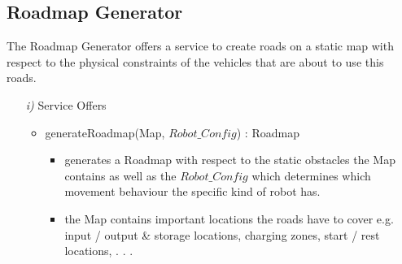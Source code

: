 \documentclass{article}
\begin{document}
\subsection{Roadmap Generator}
The Roadmap Generator offers a service to create roads on a static map with respect to the physical constraints of the vehicles that are about to use this roads.
\begin{enumerate}
	\item[\textit{i)}] Service Offers
	\begin{itemize}
		\item generateRoadmap(Map, $Robot\_Config$) : Roadmap
		\begin{itemize}
			\item generates a Roadmap with respect to the static obstacles the Map contains as well as the $Robot\_Config$ which determines which movement behaviour the specific kind of robot has.
			\item the Map contains important locations the roads have to cover e.g. input / output \& storage locations, charging zones, start / rest locations, . . .
		\end{itemize}
	\end{itemize}
\end{enumerate}
\end{document}
